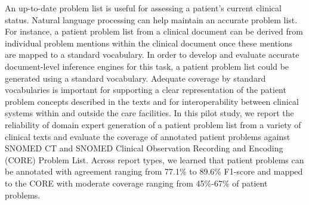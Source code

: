 An up-to-date problem list is useful for assessing a patient's current clinical status. Natural language processing can help maintain an accurate problem list. For instance, a patient problem list from a clinical document can be derived from individual problem mentions within the clinical document once these mentions are mapped to a standard vocabulary. In order to develop and evaluate accurate document-level inference engines for this task, a patient problem list could be generated using a standard vocabulary. Adequate coverage by standard vocabularies is important for supporting a clear representation of the patient problem concepts described in the texts and for interoperability between clinical systems within and outside the care facilities. In this pilot study, we report the reliability of domain expert generation of a patient problem list from a variety of clinical texts and evaluate the coverage of annotated patient problems against SNOMED CT and SNOMED Clinical Observation Recording and Encoding (CORE) Problem List. Across report types, we learned that patient problems can be annotated with agreement ranging from 77.1\% to 89.6\% F1-score and mapped to the CORE with moderate coverage ranging from 45\%-67\% of patient problems.
